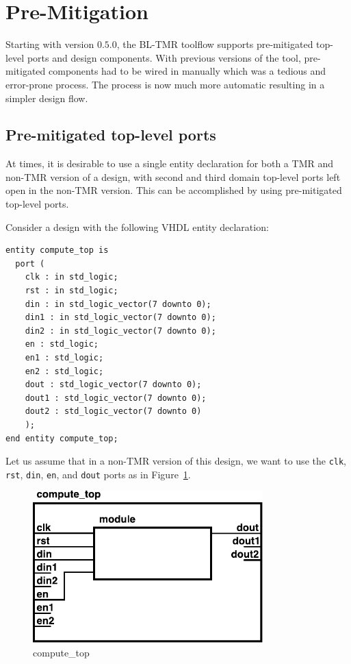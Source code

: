 \section{Pre-Mitigation}
\label{sec:pre-mitigation}
Starting with version $0.5.0$, the BL-TMR toolflow supports pre-mitigated
top-level ports and design components. With previous versions of the tool,
pre-mitigated components had to be wired in manually which was a tedious and
error-prone process. The process is now much more automatic resulting in a
simpler design flow.

\subsection{Pre-mitigated top-level ports}
At times, it is desirable to use a single entity declaration for both a TMR and
non-TMR version of a design, with second and third domain top-level ports left
open in the non-TMR version. This can be accomplished by using pre-mitigated
top-level ports.

Consider a design with the following VHDL entity declaration:
\begin{verbatim}
entity compute_top is
  port (
    clk : in std_logic;
    rst : in std_logic;
    din : in std_logic_vector(7 downto 0);
    din1 : in std_logic_vector(7 downto 0);
    din2 : in std_logic_vector(7 downto 0);
    en : std_logic;
    en1 : std_logic;
    en2 : std_logic;
    dout : std_logic_vector(7 downto 0);
    dout1 : std_logic_vector(7 downto 0);
    dout2 : std_logic_vector(7 downto 0)
    );
end entity compute_top;
\end{verbatim}

Let us assume that in a non-TMR version of this design, we want to use the
\texttt{clk}, \texttt{rst}, \texttt{din}, \texttt{en}, and \texttt{dout} ports
as in Figure~\ref{fig:compute_top}.

\begin{figure}[htb]
\begin{center}
\includegraphics[width=3.5in]{compute_top.pdf}
\caption{compute\_top}
\label{fig:compute_top}
\end{center}
\end{figure}


